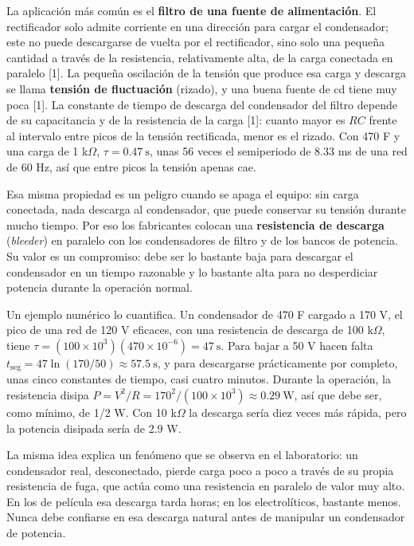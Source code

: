 \documentclass[11pt,letterpaper]{article}
\begin{document}
La aplicación más común es el \textbf{filtro de una fuente de alimentación}. El rectificador solo admite corriente en una dirección para cargar el condensador; este no puede descargarse de vuelta por el rectificador, sino solo una pequeña cantidad a través de la resistencia, relativamente alta, de la carga conectada en paralelo [1]. La pequeña oscilación de la tensión que produce esa carga y descarga se llama \textbf{tensión de fluctuación} (rizado), y una buena fuente de cd tiene muy poca [1]. La constante de tiempo de descarga del condensador del filtro depende de su capacitancia y de la resistencia de la carga [1]: cuanto mayor es $RC$ frente al intervalo entre picos de la tensión rectificada, menor es el rizado. Con 470 \textmu{}F y una carga de 1 k\ensuremath{\Omega}, $\tau = 0.47\ \text{s}$, unas 56 veces el semiperiodo de 8.33 ms de una red de 60 Hz, así que entre picos la tensión apenas cae.

Esa misma propiedad es un peligro cuando se apaga el equipo: sin carga conectada, nada descarga al condensador, que puede conservar su tensión durante mucho tiempo. Por eso los fabricantes colocan una \textbf{resistencia de descarga} (\textit{bleeder}) en paralelo con los condensadores de filtro y de los bancos de potencia. Su valor es un compromiso: debe ser lo bastante baja para descargar el condensador en un tiempo razonable y lo bastante alta para no desperdiciar potencia durante la operación normal.

Un ejemplo numérico lo cuantifica. Un condensador de 470 \textmu{}F cargado a 170 V, el pico de una red de 120 V eficaces, con una resistencia de descarga de 100 k\ensuremath{\Omega}, tiene $\tau = (100 \times 10^3)(470 \times 10^{-6}) = 47\ \text{s}$. Para bajar a 50 V hacen falta $t_{\mathrm{seg}} = 47 \ln(170/50) \approx 57.5\ \text{s}$, y para descargarse prácticamente por completo, unas cinco constantes de tiempo, casi cuatro minutos. Durante la operación, la resistencia disipa $P = V^2/R = 170^2/(100 \times 10^3) \approx 0.29\ \text{W}$, así que debe ser, como mínimo, de 1/2 W. Con 10 k\ensuremath{\Omega} la descarga sería diez veces más rápida, pero la potencia disipada sería de 2.9 W.

La misma idea explica un fenómeno que se observa en el laboratorio: un condensador real, desconectado, pierde carga poco a poco a través de su propia resistencia de fuga, que actúa como una resistencia en paralelo de valor muy alto. En los de película esa descarga tarda horas; en los electrolíticos, bastante menos. Nunca debe confiarse en esa descarga natural antes de manipular un condensador de potencia.
\end{document}
